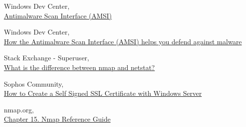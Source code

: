 \documentclass[10pt,a4paper]{article}
\begin{document}
\begin{thebibliography}{9}
   Windows Dev Center,\\
	\href{https://docs.microsoft.com/en-us/windows/win32/amsi/antimalware-scan-interface-portal}{Antimalware Scan Interface (AMSI)}
	
   Windows Dev Center,\\
	\href{https://docs.microsoft.com/en-us/windows/win32/amsi/how-amsi-helps}{How the Antimalware Scan Interface (AMSI) helps you defend against malware}

	Stack Exchange - Superuser,\\	
	\href{https://superuser.com/questions/1065478/what-is-the-difference-between-nmap-and-netstat}{What is the difference between nmap and netstat?}

	Sophos Community,\\
	\href{https://community.sophos.com/kb/en-us/132438}{How to Create a Self Signed SSL Certificate with Windows Server}

	nmap.org,\\
	\href{https://nmap.org/book/man.html}{Chapter 15. Nmap Reference Guide}
  
\end{thebibliography}
\end{document}
